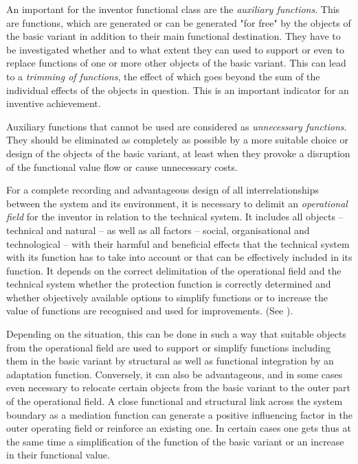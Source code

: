 \documentclass[11pt,a4paper]{article}
\begin{document}
An important for the inventor functional class are the \emph{auxiliary
  functions}. This are functions, which are generated or can be generated "for
free" by the objects of the basic variant in addition to their main functional
destination.  They have to be investigated whether and to what extent they can
used to support or even to replace functions of one or more other objects of
the basic variant. This can lead to a \emph{trimming of functions}, the effect
of which goes beyond the sum of the individual effects of the objects in
question. This is an important indicator for an inventive achievement.

Auxiliary functions that cannot be used are considered as \emph{unnecessary
  functions}.  They should be eliminated as completely as possible by a more
suitable choice or design of the objects of the basic variant, at least when
they provoke a disruption of the functional value flow or cause unnecessary
costs.

For a complete recording and advantageous design of all interrelationships
between the system and its environment, it is necessary to delimit an
\emph{operational field} for the inventor in relation to the technical system.
It includes all objects -- technical and natural -- as well as all factors --
social, organisational and technological -- with their harmful and beneficial
effects that the technical system with its function has to take into account
or that can be effectively included in its function. It depends on the correct
delimitation of the operational field and the technical system whether the
protection function is correctly determined and whether objectively available
options to simplify functions or to increase the value of functions are
recognised and used for improvements. (See \cite[A.3]{RM-21}).

Depending on the situation, this can be done in such a way that suitable
objects from the operational field are used to support or simplify functions
including them in the basic variant by structural as well as functional
integration by an adaptation function.  Conversely, it can also be
advantageous, and in some cases even necessary to relocate certain objects
from the basic variant to the outer part of the operational field. A close
functional and structural link across the system boundary as a mediation
function can generate a positive influencing factor in the outer operating
field or reinforce an existing one. In certain cases one gets thus at the same
time a simplification of the function of the basic variant or an increase in
their functional value.
\end{document}

